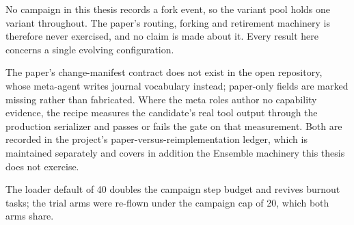 \begin{description}[leftmargin=1.4em,style=nextline,itemsep=5pt]
  \item[\textnormal{\textbf{Single lineage.}}] No campaign in this thesis
        records a fork event, so the variant pool holds one variant
        throughout. The paper's routing, forking and retirement machinery
        is therefore never exercised, and no claim is made about it. Every
        result here concerns a single evolving configuration.

  \item[\textnormal{\textbf{Manifest schema and capability evidence.}}]
         The paper's change-manifest contract does not exist in the
        open repository, whose meta-agent writes journal vocabulary
        instead; paper-only fields are marked missing rather than
        fabricated. Where the meta roles author no capability evidence, the
        recipe measures the candidate's real tool output through the
        production serializer and passes or fails the gate on that
        measurement. Both are recorded in the project's
        paper-versus-reimplementation ledger, which is maintained
        separately and covers
        in addition the Ensemble machinery this thesis does not exercise.

  \item[\textnormal{\textbf{The efficacy trial's \texttt{-{}-max-steps}
        correction.}}] The loader default of 40 doubles the campaign
        step budget and revives burnout tasks; the trial arms were
        re-flown under the campaign cap of 20, which both arms share.

\end{description}
